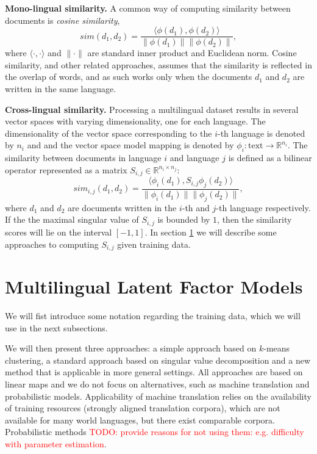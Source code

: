 \documentclass[twoside,11pt]{article}
\newcommand{\todo}[1]{\textcolor{red}{TODO: #1}}
\newcommand{\RR}{\mathbb{R}}
\begin{document}
\textbf {Mono-lingual similarity.}
A common way of computing similarity between documents is \emph{cosine similarity},
$$sim(d_1, d_2) = \frac{\langle \phi(d_1), \phi(d_2)\rangle}{\|\phi(d_1)\| \|\phi(d_2)\|},$$
where $\langle \cdot,\cdot \rangle$ and $\|\cdot\|$ are standard inner product and Euclidean norm. Cosine similarity, and other related approaches, assumes that the similarity is reflected in the overlap of words, and as such works only when the documents $d_1$ and $d_2$ are written in the same language.

\textbf {Cross-lingual similarity.}
Processing a multilingual dataset results in several vector spaces with varying dimensionality, one for each language. The dimensionality of the vector space corresponding to the $i$-th language is denoted by $n_i$ and and the vector space model mapping is denoted by $\phi_i : \text{text} \rightarrow \RR^{n_i}$.
The similarity between documents in language $i$ and language $j$ is defined as a bilinear operator represented as a matrix $S_{i,j} \in \RR^{n_i \times n_j}$:
$$sim_{i,j}(d_1, d_2) = \frac{ \langle \phi_i (d_1), S_{i,j} \phi_j (d_2) \rangle }{\|\phi_i(d_1)\| \|\phi_j(d_2)\|},$$
where $d_1$ and $d_2$ are documents written in the $i$-th and $j$-th language respectively. If the the maximal singular value of $S_{i,j}$ is bounded by $1$, then the similarity scores will lie on the interval $[-1, 1]$. In section \ref{sec:models} we will describe some approaches to computing $S_{i,j}$ given training data.

\section{Multilingual Latent Factor Models}\label{sec:models}

We will fist introduce some notation regarding the training data, which we will use in the next subsections.

We will then present three approaches: a simple approach based on $k$-means clustering, a standard approach based on singular value decomposition and a new method that is applicable in more general
settings. All approaches are based on linear maps and we do not focus on alternatives, such as machine translation and probabilistic models. Applicability of machine translation relies
on the availability of training resources (strongly aligned translation corpora), which are not available for many world languages, but there exist comparable corpora. Probabilistic
methods \todo{provide reasons for not using them: e.g. difficulty with parameter estimation}.
\end{document}
